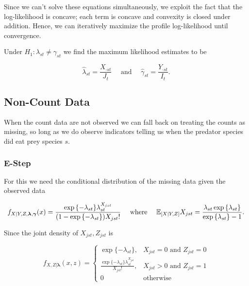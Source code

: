 \documentclass[12pt]{article}\usepackage[]{graphicx}\usepackage[]{color}
\begin{document}
\noindent Since we can't solve these equations simultaneously, we exploit the fact that the log-likelihood is concave; each term is concave and convexity is closed under addition.  Hence, we can iteratively maximize the profile log-likelihood until convergence.  

Under $H_1: \lambda_{st} \ne \gamma_{st}$ we find the maximum likelihood estimates to be

\begin{equation*}
  \hat{\lambda}_{st} = \frac{X_{\cdot st}}{J_{t}} \quad \text{ and } \quad \hat{\gamma}_{st} = \frac{Y_{\cdot st}}{I_{t}}.
\end{equation*}

\subsection{Non-Count Data}

When the count data are not observed we can fall back on treating the counts as missing, so long as we do observe indicators telling us when the predator species did eat prey species $s$.  

\subsubsection*{E-Step}
For this we need the conditional distribution of the missing data given the observed data

\begin{equation*}
  f_{X|Y,Z,\boldsymbol{\lambda},\boldsymbol{\gamma}}(x) =
    \frac{\exp{\{-\lambda_{st}\}} \lambda_{st}^{X_{jst}}}{(1 - \exp{\{-\lambda_{st}\}}) X_{jst}!} \quad \text{ where } \quad \mathbb{E}_{[X|Y,Z]}X_{jst} = \frac{\lambda_{st} \exp{\{\lambda_{st} \}}}{\exp{\{ \lambda_{st} \}} - 1}.
\end{equation*}

Since the joint density of $X_{jst}, Z_{jst}$ is

\begin{equation*}
  f_{X,Z|\boldsymbol{\lambda}}(x,z) = \left\{
    \begin{array}{lr}
      \exp{\{ -\lambda_{st} \}}, & X_{jst}=0 \mbox{ and } Z_{jst} = 0 \\
      \frac{\exp{\{-\lambda_{st} \}} \lambda_{st}^{X_{jst}}}{X_{jst}!}, & X_{jst} > 0 \mbox{ and } Z_{jst} = 1\\
      0 & \mbox{otherwise}
    \end{array}
  \right.
\end{equation*}
\end{document}
